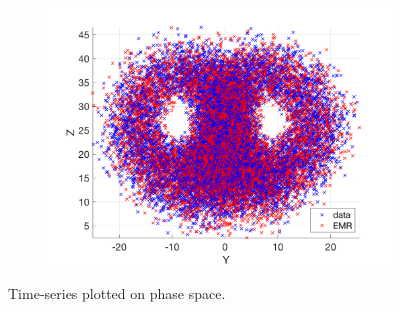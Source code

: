 \documentclass[12pt]{article}
\begin{document}
\begin{figure}[H]
\begin{subfigure}[b]{0.3\textwidth}
		\includegraphics[width=\textwidth]{plots/l63/traj3.png}
	\end{subfigure}
	\caption{Time-series plotted on phase space.}
\end{figure}
\end{document}
